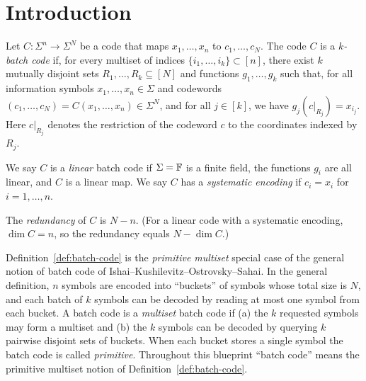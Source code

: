 %

\chapter{Introduction}

\begin{definition}
  \label{def:batch-code}
  Let $C : \Sigma^n \to \Sigma^N$ be a code that maps $x_1, \dots, x_n$ to
  $c_1, \dots, c_N$. The code $C$ is a \emph{$k$-batch code} if, for every
  multiset of indices $\{i_1, \dots, i_k\} \subset [n]$, there exist $k$
  mutually disjoint sets $R_1, \dots, R_k \subseteq [N]$ and functions
  $g_1, \dots, g_k$ such that, for all information symbols
  $x_1, \dots, x_n \in \Sigma$ and codewords
  $(c_1, \dots, c_N) = C(x_1, \dots, x_n) \in \Sigma^N$, and for all
  $j \in [k]$, we have $g_j(c|_{R_j}) = x_{i_j}$. Here $c|_{R_j}$ denotes the
  restriction of the codeword $c$ to the coordinates indexed by $R_j$.

  We say $C$ is a \emph{linear} batch code if $\Sigma = \mathbb{F}$ is a finite field,
  the functions $g_i$ are all linear, and $C$ is a linear map. We say $C$ has a
  \emph{systematic encoding} if $c_i = x_i$ for $i = 1, \dots, n$.

  The \emph{redundancy} of $C$ is $N - n$. (For a linear code with a systematic
  encoding, $\dim C = n$, so the redundancy equals $N - \dim C$.)
\end{definition}

\begin{definition}
  \label{def:primitive}
  Definition~\ref{def:batch-code} is the \emph{primitive multiset} special case
  of the general notion of batch code of Ishai--Kushilevitz--Ostrovsky--Sahai.
  In the general definition, $n$ symbols are encoded into ``buckets'' of symbols
  whose total size is $N$, and each batch of $k$ symbols can be decoded by
  reading at most one symbol from each bucket. A batch code is a \emph{multiset}
  batch code if (a) the $k$ requested symbols may form a multiset and (b) the
  $k$ symbols can be decoded by querying $k$ pairwise disjoint sets of buckets.
  When each bucket stores a single symbol the batch code is called
  \emph{primitive}. Throughout this blueprint ``batch code'' means the primitive
  multiset notion of Definition~\ref{def:batch-code}.
\end{definition}


